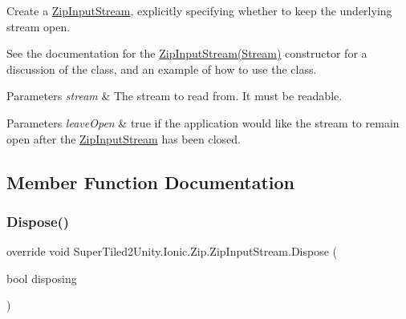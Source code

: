 Create a {\ttfamily \mbox{\hyperlink{class_super_tiled2_unity_1_1_ionic_1_1_zip_1_1_zip_input_stream}{Zip\+Input\+Stream}}}, explicitly specifying whether to keep the underlying stream open. 

See the documentation for the \mbox{\hyperlink{class_super_tiled2_unity_1_1_ionic_1_1_zip_1_1_zip_input_stream_af9203130f058abb23317725bcb98c047}{Zip\+Input\+Stream(\+Stream)}} constructor for a discussion of the class, and an example of how to use the class. 


\begin{DoxyParams}{Parameters}
{\em stream} & The stream to read from. It must be readable. \\
\hline
\end{DoxyParams}



\begin{DoxyParams}{Parameters}
{\em leave\+Open} & true if the application would like the stream to remain open after the {\ttfamily \mbox{\hyperlink{class_super_tiled2_unity_1_1_ionic_1_1_zip_1_1_zip_input_stream}{Zip\+Input\+Stream}}} has been closed. \\
\hline
\end{DoxyParams}


\subsection{Member Function Documentation}
\mbox{\label{class_super_tiled2_unity_1_1_ionic_1_1_zip_1_1_zip_input_stream_a27f6b4a5f9fd86beaf360d8b1594b91d}} 
\subsubsection{\texorpdfstring{Dispose()}{Dispose()}}
{\footnotesize\ttfamily override void Super\+Tiled2\+Unity.\+Ionic.\+Zip.\+Zip\+Input\+Stream.\+Dispose (\begin{DoxyParamCaption}\item[{bool}]{disposing }\end{DoxyParamCaption})\hspace{0.3cm}{\ttfamily [protected]}}



